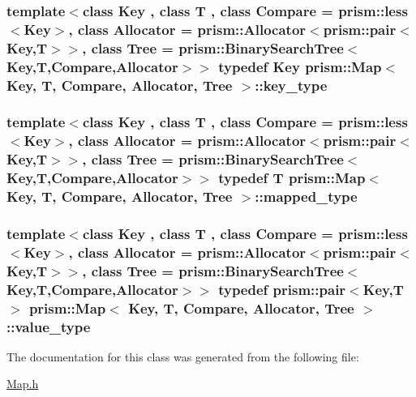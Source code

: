 \subsubsection[{\texorpdfstring{key\+\_\+type}{key_type}}]{\setlength{\rightskip}{0pt plus 5cm}template$<$class Key , class T , class Compare  = prism\+::less$<$\+Key$>$, class Allocator  = prism\+::\+Allocator$<$prism\+::pair$<$\+Key,\+T$>$$>$, class Tree  = prism\+::\+Binary\+Search\+Tree$<$\+Key,\+T,\+Compare,\+Allocator$>$$>$ typedef Key {\bf prism\+::\+Map}$<$ Key, T, Compare, {\bf Allocator}, Tree $>$\+::{\bf key\+\_\+type}}\hypertarget{classprism_1_1_map_a6283cb3456c68eb923bc85da29145726}{}\label{classprism_1_1_map_a6283cb3456c68eb923bc85da29145726}
\subsubsection[{\texorpdfstring{mapped\+\_\+type}{mapped_type}}]{\setlength{\rightskip}{0pt plus 5cm}template$<$class Key , class T , class Compare  = prism\+::less$<$\+Key$>$, class Allocator  = prism\+::\+Allocator$<$prism\+::pair$<$\+Key,\+T$>$$>$, class Tree  = prism\+::\+Binary\+Search\+Tree$<$\+Key,\+T,\+Compare,\+Allocator$>$$>$ typedef T {\bf prism\+::\+Map}$<$ Key, T, Compare, {\bf Allocator}, Tree $>$\+::{\bf mapped\+\_\+type}}\hypertarget{classprism_1_1_map_a4df78b98ece716ef83ea96312cb8f144}{}\label{classprism_1_1_map_a4df78b98ece716ef83ea96312cb8f144}
\subsubsection[{\texorpdfstring{value\+\_\+type}{value_type}}]{\setlength{\rightskip}{0pt plus 5cm}template$<$class Key , class T , class Compare  = prism\+::less$<$\+Key$>$, class Allocator  = prism\+::\+Allocator$<$prism\+::pair$<$\+Key,\+T$>$$>$, class Tree  = prism\+::\+Binary\+Search\+Tree$<$\+Key,\+T,\+Compare,\+Allocator$>$$>$ typedef {\bf prism\+::pair}$<$Key,T$>$ {\bf prism\+::\+Map}$<$ Key, T, Compare, {\bf Allocator}, Tree $>$\+::{\bf value\+\_\+type}}\hypertarget{classprism_1_1_map_a21b00d887e1302d00061354c35c54f89}{}\label{classprism_1_1_map_a21b00d887e1302d00061354c35c54f89}


The documentation for this class was generated from the following file\+:\begin{DoxyCompactItemize}
\item 
\hyperlink{_map_8h}{Map.\+h}\end{DoxyCompactItemize}
